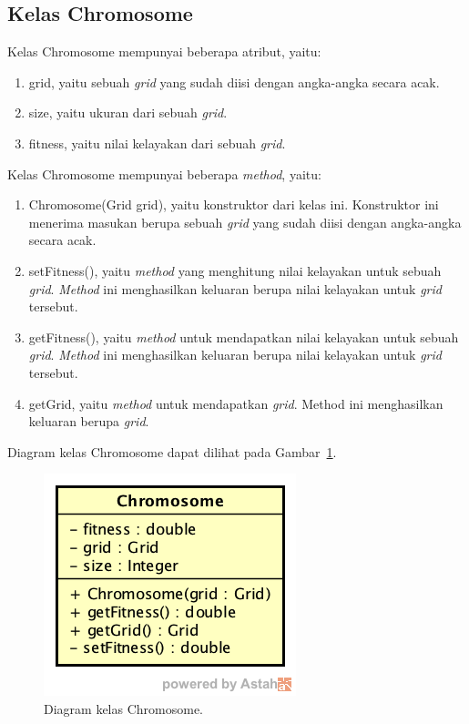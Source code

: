 \subsection{Kelas Chromosome}
\label{sec:kelaschromosome}

Kelas Chromosome mempunyai beberapa atribut, yaitu:

\begin{enumerate}
\item grid, yaitu sebuah \textit{grid} yang sudah diisi dengan angka-angka secara acak.
\item size, yaitu ukuran dari sebuah \textit{grid}.
\item fitness, yaitu nilai kelayakan dari sebuah \textit{grid}.
\end{enumerate}

Kelas Chromosome mempunyai beberapa \textit{method}, yaitu:

\begin{enumerate}
\item Chromosome(Grid grid), yaitu konstruktor dari kelas ini. Konstruktor ini menerima masukan berupa sebuah \textit{grid} yang sudah diisi dengan angka-angka secara acak.
\item setFitness(), yaitu \textit{method} yang menghitung nilai kelayakan untuk sebuah \textit{grid}. \textit{Method} ini menghasilkan keluaran berupa nilai kelayakan untuk \textit{grid} tersebut.
\item getFitness(), yaitu \textit{method} untuk mendapatkan nilai kelayakan untuk sebuah \textit{grid}. \textit{Method} ini menghasilkan keluaran berupa nilai kelayakan untuk \textit{grid} tersebut.
\item getGrid, yaitu \textit{method} untuk mendapatkan \textit{grid}. Method ini menghasilkan keluaran berupa \textit{grid}.
\end{enumerate}

Diagram kelas Chromosome dapat dilihat pada Gambar~\ref{fig:diagramkelaschromosome}.

\begin{figure}
\centering
\captionsetup{justification=centering}
\includegraphics[scale=0.5]{Gambar/Perancangan/DiagramKelasChromosome.png}
\caption[Diagram kelas Chromosome.]{Diagram kelas Chromosome.}
\label{fig:diagramkelaschromosome}
\end{figure}

